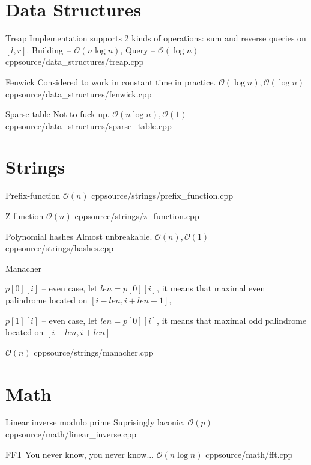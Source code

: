 \documentclass[landscape, 10pt, a4paper, oneside, twocolumn]{extarticle}
\begin{document}
\section{Data Structures}

\Algorithm
{Treap}
{Implementation supports 2 kinds of operations: sum and reverse queries on $[l, r]$.}
{Building – $\mathcal{O}(n \log n)$, Query – $\mathcal{O}(\log n)$}
{cpp}{source/data_structures/treap.cpp}

\Algorithm
{Fenwick}
{Considered to work in constant time in practice.}
{$\mathcal{O}(\log n), \mathcal{O}(\log n)$}
{cpp}{source/data_structures/fenwick.cpp}

\Algorithm
{Sparse table}
{Not to fuck up.}
{$\mathcal{O}(n \log n), \mathcal{O}(1)$}
{cpp}{source/data_structures/sparse_table.cpp}




\section{Strings}

\Algorithm
{Prefix-function}
{}
{$\mathcal{O}(n)$}
{cpp}{source/strings/prefix_function.cpp}

\Algorithm
{Z-function}
{}
{$\mathcal{O}(n)$}
{cpp}{source/strings/z_function.cpp}

\Algorithm
{Polynomial hashes}
{Almost unbreakable.}
{$\mathcal{O}(n), \mathcal{O}(1)$}
{cpp}{source/strings/hashes.cpp}

\Algorithm
{Manacher}
{$p[0][i]$ – even case, let $len = p[0][i]$,
it means that maximal even palindrome located on $[i - len, i + len - 1]$,

$p[1][i]$ – even case, let $len = p[0][i]$,
it means that maximal odd palindrome located on $[i - len, i + len]$
}
{$\mathcal{O}(n)$}
{cpp}{source/strings/manacher.cpp}


\section{Math}

\Algorithm
{Linear inverse modulo prime}
{Suprisingly laconic.}
{$\mathcal{O}(p)$}
{cpp}{source/math/linear_inverse.cpp}

\Algorithm
{FFT}
{You never know, you never know...}
{$\mathcal{O}(n \log n)$}
{cpp}{source/math/fft.cpp}
\end{document}
